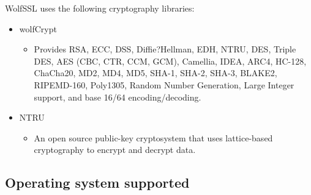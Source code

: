 \documentclass[a4paper,12pt]{article}
\begin{document}
WolfSSL uses the following cryptography libraries:
\begin{itemize}
\item wolfCrypt
\begin{itemize}
\item Provides RSA, ECC, DSS, Diffie?Hellman, EDH, NTRU, DES, Triple DES, AES (CBC, CTR, CCM, GCM), Camellia, IDEA, ARC4, HC-128, ChaCha20, MD2, MD4, MD5, SHA-1, SHA-2, SHA-3, BLAKE2, RIPEMD-160, Poly1305, Random Number Generation, Large Integer support, and base 16/64 encoding/decoding.
\end{itemize}
\item NTRU
\begin{itemize}
\item An open source public-key cryptosystem that uses lattice-based cryptography to encrypt and decrypt data. 
\end{itemize}
\end{itemize}

\cleardoublepage
\subsection{Operating system supported}
\end{document}
